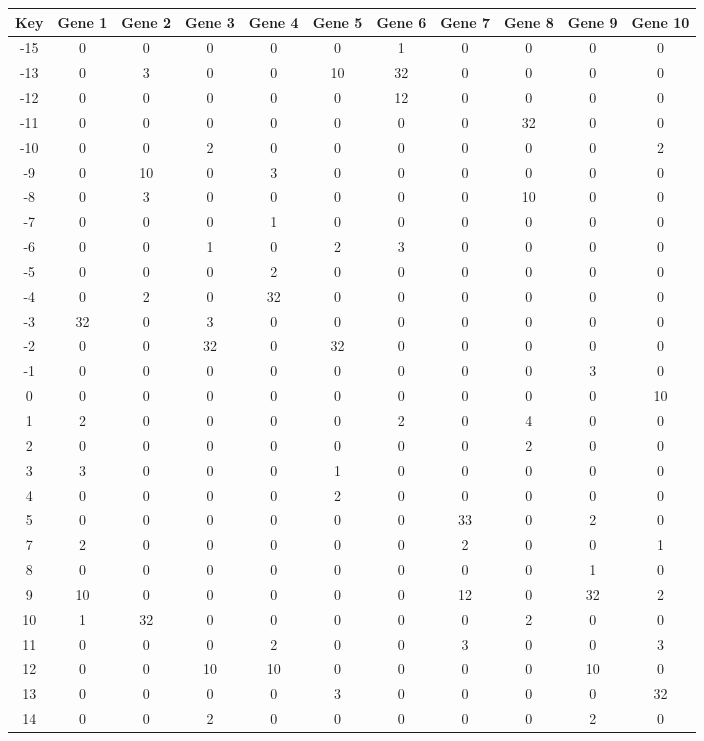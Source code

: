 \begin{tabular}{|c|c|c|c|c|c|c|c|c|c|c|}
\hline
Key & Gene 1 & Gene 2 & Gene 3 & Gene 4 & Gene 5 & Gene 6 & Gene 7 & Gene 8 & Gene 9 & Gene 10 \\
\hline
-15 & 0 & 0 & 0 & 0 & 0 & 1 & 0 & 0 & 0 & 0 \\
-13 & 0 & 3 & 0 & 0 & 10 & 32 & 0 & 0 & 0 & 0 \\
-12 & 0 & 0 & 0 & 0 & 0 & 12 & 0 & 0 & 0 & 0 \\
-11 & 0 & 0 & 0 & 0 & 0 & 0 & 0 & 32 & 0 & 0 \\
-10 & 0 & 0 & 2 & 0 & 0 & 0 & 0 & 0 & 0 & 2 \\
-9 & 0 & 10 & 0 & 3 & 0 & 0 & 0 & 0 & 0 & 0 \\
-8 & 0 & 3 & 0 & 0 & 0 & 0 & 0 & 10 & 0 & 0 \\
-7 & 0 & 0 & 0 & 1 & 0 & 0 & 0 & 0 & 0 & 0 \\
-6 & 0 & 0 & 1 & 0 & 2 & 3 & 0 & 0 & 0 & 0 \\
-5 & 0 & 0 & 0 & 2 & 0 & 0 & 0 & 0 & 0 & 0 \\
-4 & 0 & 2 & 0 & 32 & 0 & 0 & 0 & 0 & 0 & 0 \\
-3 & 32 & 0 & 3 & 0 & 0 & 0 & 0 & 0 & 0 & 0 \\
-2 & 0 & 0 & 32 & 0 & 32 & 0 & 0 & 0 & 0 & 0 \\
-1 & 0 & 0 & 0 & 0 & 0 & 0 & 0 & 0 & 3 & 0 \\
0 & 0 & 0 & 0 & 0 & 0 & 0 & 0 & 0 & 0 & 10 \\
1 & 2 & 0 & 0 & 0 & 0 & 2 & 0 & 4 & 0 & 0 \\
2 & 0 & 0 & 0 & 0 & 0 & 0 & 0 & 2 & 0 & 0 \\
3 & 3 & 0 & 0 & 0 & 1 & 0 & 0 & 0 & 0 & 0 \\
4 & 0 & 0 & 0 & 0 & 2 & 0 & 0 & 0 & 0 & 0 \\
5 & 0 & 0 & 0 & 0 & 0 & 0 & 33 & 0 & 2 & 0 \\
7 & 2 & 0 & 0 & 0 & 0 & 0 & 2 & 0 & 0 & 1 \\
8 & 0 & 0 & 0 & 0 & 0 & 0 & 0 & 0 & 1 & 0 \\
9 & 10 & 0 & 0 & 0 & 0 & 0 & 12 & 0 & 32 & 2 \\
10 & 1 & 32 & 0 & 0 & 0 & 0 & 0 & 2 & 0 & 0 \\
11 & 0 & 0 & 0 & 2 & 0 & 0 & 3 & 0 & 0 & 3 \\
12 & 0 & 0 & 10 & 10 & 0 & 0 & 0 & 0 & 10 & 0 \\
13 & 0 & 0 & 0 & 0 & 3 & 0 & 0 & 0 & 0 & 32 \\
14 & 0 & 0 & 2 & 0 & 0 & 0 & 0 & 0 & 2 & 0 \\
\hline
\end{tabular}